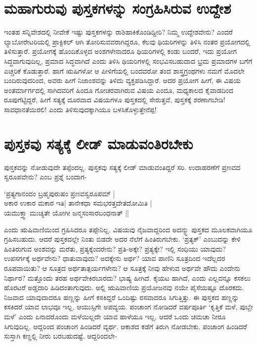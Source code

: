 \section*{ಮಹಾಗುರುವು ಪುಸ್ತಕಗಳನ್ನು ಸಂಗ್ರಹಿಸಿರುವ ಉದ್ದೇಶ}

ಇಂತಹ ಸನ್ನಿವೇಶದಲ್ಲಿ ನೀವೇಕೆ ಇಷ್ಟು ಪುಸ್ತಕಗಳನ್ನು ರಾಶಿಹಾಕಿಕೊಂಡಿದ್ದೀರಿ? ನಿಮ್ಮ ಉದ್ದೇಶವೇನು? ಎಂದರೆ ಲ್ಯಾಬೋರೇಟರಿಯಲ್ಲಿ ಪ್ರಾಕ್ಟಿಕಲ್  ಆಗಿ ತೋರಿಸುವವರಾಗಿದ್ದರೂ, ಕೆಲವು ಥಿಯರಿಗಳನ್ನು ತಿಳಿಸಿ ನಂತರ ಪ್ರಯೋಗದಲ್ಲಿ ತಿಳಿಸುತ್ತಾರೆ. ಪ್ರಯೋಗಕ್ಕೆ ಹೊಂದಿಕೊಳ್ಳದ ಅಂಶಗಳೇನಾದರೂ ಥಿಯರಿಗಳಲ್ಲಿ ಕಂಡು ಬಂದರೆ, ಇದು ಪ್ರಯೋಗ ಸಿದ್ಧವಾಗುವುದಿಲ್ಲ, ಪ್ರಮಾದ ಸಿದ್ಧವಾಗಿದೆ ಎಂದು ತಿಳಿಸಿ ಥಿಯರಿಗಳಲ್ಲಿ ಸಂಭವಿಸಬಹುದಾದ ಭ್ರಮ ಪ್ರಮಾದಗಳ ಬಗೆಗೆ ಎಚ್ಚರಿಕೆ ಕೊಡುತ್ತಾರೆ. ಹಾಗೆ ಋಷಿಗಳೋ ಆ ಪೀಳಿಗೆಯಲ್ಲಿ ಬಂದವರೋ ತಂದ ಶಾಸ್ತ್ರಗ್ರಂಥಗಳು ನಮಗೆ ಮೊದಲೇ ಬಂದಿರುವುದರಿಂದ, ಅವರು ಹೀಗೆ ನಿಜಾಂಶವನ್ನು ತಿಳಿದು ವ್ಯಕ್ತಪಡಿಸಿದ್ದಾರೆ. ಅದರ ಪ್ರಯೋಗ ಹೀಗೆ, ಈ ವಿಷಯ ಅಂತರ್ಮಾರ್ಗದಲ್ಲಿ ಸಾಗಿದವರಿಗೆ ಹಿಂದೂ ಗೋಚರವಾಗಿರುವ ವಿಷಯ ಎಂದೂ, ಮಧ್ಯಕಾಲದ ಕೈವಾಡದಿಂದ ರೂಪುಗೆಟ್ಟಿದ್ದರೆ, ಹೀಗೆ ಸತ್ಯಕ್ಕೆ ದೂರವಾದ ವಿಷಯಗಳೂ ಪುಸ್ತಕದಲ್ಲಿ ಸೇರುತ್ತವೆ, ಪುಸ್ತಕಕ್ಕೆ ಶರಣಾಗಬೇಡಿ! ಸಾವಧಾನತೆಯಿರಲಿ! ಎಂದು ತಿಳಿಸುವುದಕ್ಕಾಗಿಯೂ ಬಳಸಿಕೊಳ್ಳುತ್ತೇನೆಪ್ಪ!

\section*{ಪುಸ್ತಕವು ಸತ್ಯಕ್ಕೆ ಲೀಡ್ ಮಾಡುವಂತಿರಬೇಕು}

ಪುಸ್ತಕವನ್ನು ನೋಡುವುದೇ ತಪ್ಪೆಂದಲ್ಲ. ಪುಸ್ತಕವು ಸತ್ಯಕ್ಕೆ ಲೀಡ್ ಮಾಡುವಂತಿದ್ದರೆ ಸರಿ. ಉದಾಹರಣೆಗೆ ಪ್ರಣವದ ಸ್ವರೂಪವೇನು? ಎಂಬ ಪ್ರಶ್ನೆ ಬಂದಾಗ-

\begin{shloka}
`ಪ್ರತ್ಯಗಾನಂದಂ ಬ್ರಹ್ಮಪುರುಷಂ ಪ್ರಣವಸ್ವರೂಪಮ್ |\label{106a}\\
ಅಕಾರ ಉಕಾರ ಮಕಾರ ಇತಿ| ತಾನೇಕಧಾ ಸಮಭರತ್ತದೇತದೋಮಿತಿ |\\
ಯಮುಕ್ತ್ವಾ ಮುಚ್ಯತೇ ಯೋಗೀ ಜನ್ಮಸಂಸಾರಬಂಧನಾತ್ ||
\end{shloka}

ಎಂದು ಋಷಿವಾಣಿಯಿಂದ ಗ್ರಹಿಸಿದರೂ ತಪ್ಪೇನಿಲ್ಲ. ವಿಷಯವು ನೈಜವಾದ್ದರಿಂದ ಅದನ್ಮ್ನು ಪುಸ್ತಕದ ಮೂಲಕವಾಗಿಯೂ ಗ್ರಹಿಸಬಹುದು. ಆದರೆ ಪುಸ್ತಕದಲ್ಲೇ ನಿಂತು ಬಿಡದೇ ಅದರ ನೆಲೆಗೆ ಹಿಂತಿರುಗಬೇಕು. `ಪ್ರತ್ಯಕ್' ಎಂಬುದನ್ನು ಕೇಳಿ ಹಿಂತಿರುಗುವ ಅಂಶವನ್ನು ಮರೆತು, ಪ್ರತ್ಯಕ್ಕೆಂದರೇನು? ಪ್ರತಿ-ಅಕ್ಕೇ? ಪ್ರತ್ಯಕ್ಕೇ? ಇಲ್ಲಿ ಸಂಧಿಯು ಯಾವುದು? ಉಪಸರ್ಗಕ್ಕೆ ಅರ್ಥವೇನು? ಧಾತುವಾವುದು? ಅದಕ್ಕೇನು ಅರ್ಥ? ಯಾವ ಪಾಣಿನಿ ಸೂತ್ರದಿಂದ ಇದೆಲ್ಲದರ ರೂಪವಾಯಿತು? ಆ ಸೂತ್ರದ ಅರ್ಥತಾತ್ಪರ್ಯಗಳೇನು? ಆ ಸೂತ್ರಕ್ಕೆ ನೀವು ಹೇಳುವ ಅರ್ಥವೇ ಹೌದು ಎಂದೇನು ನಿರ್ಥಾರ? ಮತ್ತೊಂದು ತರಹ ಅರ್ಥವೇಕಿರಬಾರದು? ಭಾಷ್ಯ ಹೀಗಿದೆ. ಕೈಯಟ ಹಾಗಿದೆ, ಎಂದು ಎಲ್ಲವನ್ನೂ ಕಸಕಲು ಹೊರಟರೆ ಅಡ್ಡದಾರಿ ಹಿಡಿದಂತಾಗುವುದು. ಅಲ್ಲಿ ಋಷಿವಾಣಿಯ ಪ್ರಯೋಜನವು ನಯೇ ಪೈಸೆಯಷ್ಟೂ ದೊರಕದು. ನಿಜವಾದ ಯಾವುದಾದರೂ ಹಣ್ಣನ್ನು ಹೀಗೆ ಕಸಕಿದ್ದರೆ ಒಂದಿಷ್ಟು ರಸವಾದರೂ ಸಿಗುತ್ತಿತ್ತು. ಈ ಪುಸ್ತಕದ ಹಣ್ಣನ್ನು ಕಸಕಿದರೆ ಯಾವ ಲಾಭವೂ ಇಲ್ಲ. ಆಯುಸ್ಸಿಗೇ ಅಪವ್ಯಯ. ಪಂಚಾಂಗ ನೋಡಿದರೆ ವರ್ಷಪೂರ್ತಿ `ಕೃತ್ತಿಕೆ ಮಳೆ, ಪುಬ್ಬೇ ಮಳೆ' ಎಂದು ಏನಾದರೊಂದು ಮಳೆಯಿಲ್ಲದೇ ಯಾವ ಹಾಳೆಯೂ ಇಲ್ಲ. ಆದರೆ ಒಂದು ಚಮಚಾ ನೀರೂ ಸಿಗುವುದಿಲ್ಲ. ಆದ್ದರಿಂದ ಪಂಚಾಂಗ ಹಿಂಡಿದರೆ ವ್ಯರ್ಥ. ಆಕಾಶದ ಕಡೆಗೆ ತಿರುಗಿ ನೋಡಬೇಕು. ಪಂಚಾಂಗ ಹಿಂಡಿದರೆ ಸುಸ್ತಾಗಿ ಕಣ್ಣಲ್ಲಿ ನೀರು ಬರಬಹುದಷ್ಟೆ. ಆದ್ದರಿಂದಲೇ-

